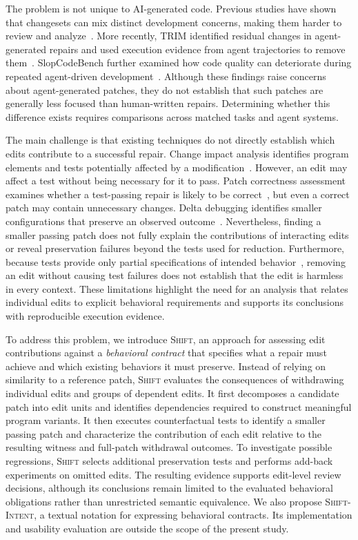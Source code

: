 \documentclass[a4paper,fleqn]{cas-sc}
\newcommand{\tool}{\textsc{Shift}}
\newcommand{\dsl}{\textsc{Shift-Intent}}
\begin{document}
The problem is not unique to AI-generated code. Previous studies have shown that changesets can mix distinct development concerns, making them harder to review and analyze~\citep{herzig2013tangled,barnett2015untangle}. More recently, TRIM identified residual changes in agent-generated repairs and used execution evidence from agent trajectories to remove them~\citep{mathai2026trim}. SlopCodeBench further examined how code quality can deteriorate during repeated agent-driven development~\citep{orlanski2026slopcodebench}. Although these findings raise concerns about agent-generated patches, they do not establish that such patches are generally less focused than human-written repairs. Determining whether this difference exists requires comparisons across matched tasks and agent systems.

The main challenge is that existing techniques do not directly establish which edits contribute to a successful repair. Change impact analysis identifies program elements and tests potentially affected by a modification~\citep{li2013cia,ren2004chianti}. However, an edit may affect a test without being necessary for it to pass. Patch correctness assessment examines whether a test-passing repair is likely to be correct~\citep{qi2015kali,smith2015cure,wang2020apr}, but even a correct patch may contain unnecessary changes. Delta debugging identifies smaller configurations that preserve an observed outcome~\citep{zeller2002ddmin}. Nevertheless, finding a smaller passing patch does not fully explain the contributions of interacting edits or reveal preservation failures beyond the tests used for reduction. Furthermore, because tests provide only partial specifications of intended behavior~\citep{barr2015oracle}, removing an edit without causing test failures does not establish that the edit is harmless in every context. These limitations highlight the need for an analysis that relates individual edits to explicit behavioral requirements and supports its conclusions with reproducible execution evidence.

To address this problem, we introduce \tool{}, an approach for assessing edit contributions against a \emph{behavioral contract} that specifies what a repair must achieve and which existing behaviors it must preserve. Instead of relying on similarity to a reference patch, \tool{} evaluates the consequences of withdrawing individual edits and groups of dependent edits. It first decomposes a candidate patch into edit units and identifies dependencies required to construct meaningful program variants. It then executes counterfactual tests to identify a smaller passing patch and characterize the contribution of each edit relative to the resulting witness and full-patch withdrawal outcomes. To investigate possible regressions, \tool{} selects additional preservation tests and performs add-back experiments on omitted edits. The resulting evidence supports edit-level review decisions, although its conclusions remain limited to the evaluated behavioral obligations rather than unrestricted semantic equivalence. We also propose \dsl{}, a textual notation for expressing behavioral contracts. Its implementation and usability evaluation are outside the scope of the present study.
\end{document}
